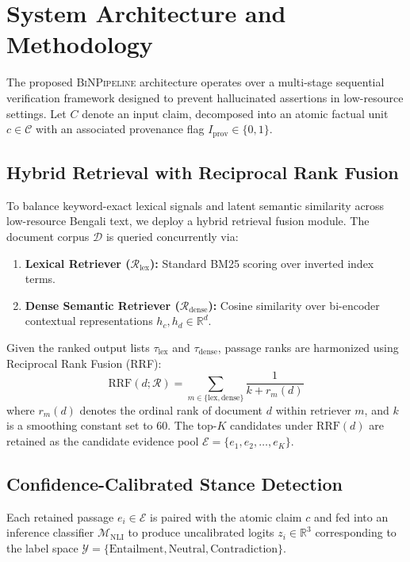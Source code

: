 
\section{System Architecture and Methodology}
\label{sec:methodology}

The proposed \textsc{BiNPipeline} architecture operates over a multi-stage sequential verification framework designed to prevent hallucinated assertions in low-resource settings. Let $C$ denote an input claim, decomposed into an atomic factual unit $c \in \mathcal{C}$ with an associated provenance flag $I_{\text{prov}} \in \{0, 1\}$.

\subsection{Hybrid Retrieval with Reciprocal Rank Fusion}
To balance keyword-exact lexical signals and latent semantic similarity across low-resource Bengali text, we deploy a hybrid retrieval fusion module. The document corpus $\mathcal{D}$ is queried concurrently via:
\begin{enumerate}
    \item \textbf{Lexical Retriever ($\mathcal{R}_{\text{lex}}$):} Standard BM25 scoring over inverted index terms.
    \item \textbf{Dense Semantic Retriever ($\mathcal{R}_{\text{dense}}$):} Cosine similarity over bi-encoder contextual representations $h_c, h_d \in \mathbb{R}^d$.
\end{enumerate}

Given the ranked output lists $\tau_{\text{lex}}$ and $\tau_{\text{dense}}$, passage ranks are harmonized using Reciprocal Rank Fusion (RRF):
\begin{equation}
\text{RRF}(d; \mathcal{R}) = \sum_{m \in \{\text{lex}, \text{dense}\}} \frac{1}{k + r_m(d)}
\end{equation}
where $r_m(d)$ denotes the ordinal rank of document $d$ within retriever $m$, and $k$ is a smoothing constant set to $60$. The top-$K$ candidates under $\text{RRF}(d)$ are retained as the candidate evidence pool $\mathcal{E} = \{e_1, e_2, \dots, e_K\}$.

\subsection{Confidence-Calibrated Stance Detection}
Each retained passage $e_i \in \mathcal{E}$ is paired with the atomic claim $c$ and fed into an inference classifier $\mathcal{M}_{\text{NLI}}$ to produce uncalibrated logits $z_i \in \mathbb{R}^3$ corresponding to the label space $\mathcal{Y} = \{\text{Entailment}, \text{Neutral}, \text{Contradiction}\}$.

